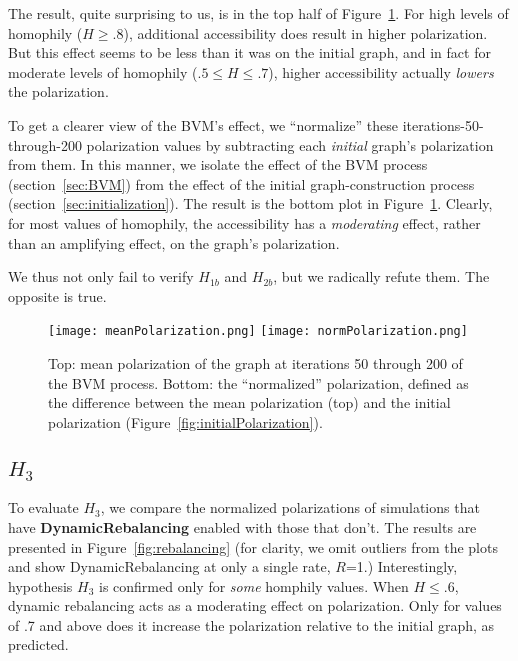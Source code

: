 The result, quite surprising to us, is in the top half of
Figure~\ref{fig:meanNormPolarization}. For high levels of homophily
($H\geq.8$), additional accessibility does result in higher polarization. But
this effect seems to be less than it was on the initial graph, and in fact for
moderate levels of homophily ($.5 \leq H \leq .7$), higher accessibility
actually \textit{lowers} the polarization. 

To get a clearer view of the BVM's effect, we ``normalize'' these
iterations-50-through-200 polarization values by subtracting each
\textit{initial} graph's polarization from them. In this manner, we isolate
the effect of the BVM process (section~\ref{sec:BVM}) from the effect of the
initial graph-construction process (section~\ref{sec:initialization}). The
result is the bottom plot in Figure~\ref{fig:meanNormPolarization}. Clearly,
for most values of homophily, the accessibility has a \textit{moderating}
effect, rather than an amplifying effect, on the graph's polarization. 

We thus not only fail to verify $H_{1b}$ and $H_{2b}$, but we radically refute
them. The opposite is true.

\begin{figure}
\centering
\texttt{[image: meanPolarization.png]}
\texttt{[image: normPolarization.png]}

\caption{Top: mean polarization of the graph at iterations 50 through 200
of the BVM process. Bottom: the ``normalized'' polarization, defined as the
difference between the mean polarization (top) and the initial polarization
(Figure~\ref{fig:initialPolarization}).}
\label{fig:meanNormPolarization}
\end{figure}

\subsection{$H_{3}$}

To evaluate $H_3$, we compare the normalized polarizations of simulations that
have \textbf{DynamicRebalancing} enabled with those that don't. The results
are presented in Figure~\ref{fig:rebalancing} (for clarity, we omit outliers
from the plots and show DynamicRebalancing at only a single rate, $R$=1.)
Interestingly, hypothesis $H_3$ is confirmed only for \textit{some} homphily
values. When $H\leq.6$, dynamic rebalancing acts as a moderating effect on
polarization. Only for values of .7 and above does it increase the
polarization relative to the initial graph, as predicted. 

